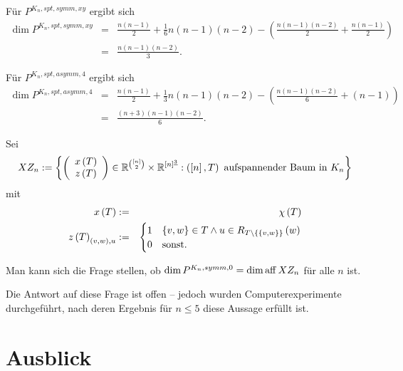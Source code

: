 \documentclass[10p,a4paper,BCOR = 12mm, DIV=15]{scrbook}
\begin{document}
{\begin{bew}
Für $P^{K_n, spt, symm, xy}$ ergibt sich
\begin{eqnarray*}
\dim P^{K_n, spt, symm, xy} & = & \frac{n \left(n-1\right)}{2}+\frac{1}{6} n \left(n-1\right)(n-2) -\left(\frac{n \left(n-1\right)\left(n-2\right)}{2}+\frac{n \left(n-1\right)}{2}\right) \\
& = & \frac{n \left(n-1\right)\left(n-2\right)}{3}.
\end{eqnarray*}

Für $P^{K_n, spt, asymm, 4}$ ergibt sich
\begin{eqnarray*}
\dim P^{K_n, spt, asymm, 4} & = & \frac{n \left(n-1\right)}{2}+\frac{1}{3} n \left(n-1\right)(n-2)  -\left(\frac{n \left(n-1\right)\left(n-2\right)}{6}+\left(n-1\right)\right) \\
& = & \frac{\left(n+3\right)\left(n-1\right)\left(n-2\right)}{6}.
\end{eqnarray*}
\end{bew}

\begin{Def}
\label{def:xz_n}
Sei
\begin{displaymath}
XZ_n := \left\{ \left(\begin{array}{c}
x\left(T\right) \\
z\left(T\right)
\end{array}\right)\in\mathbb{R}^{[n]\choose 2}\times \mathbb{R}^{[n]^{\underline{3}}}: 
\left(\left[n\right], T\right)\textnormal{ aufspannender Baum in }K_n
\right\}
\end{displaymath}
mit
\begin{eqnarray*}
x\left(T\right) & := & \chi\left(T\right) \\
z\left(T\right)_{\left(v, w\right), u} & := & \begin{cases}
1 & \left\{v, w\right\}\in T\wedge u\in R_{T\backslash \left\{\left\{v, w\right\}\right\}}\left(w\right)\\
0 & \textnormal{sonst.}
\end{cases}
\end{eqnarray*}
\end{Def}

Man kann sich die Frage stellen, ob $\dim P^{K_n, symm, 0} = \dim \operatorname{aff} XZ_n$ für alle $n$ ist.

Die Antwort auf diese Frage ist offen -- jedoch wurden Computerexperimente durchgeführt, nach deren Ergebnis für $n \leq 5$ diese Aussage erfüllt ist.

\part{Ausblick}

}
\end{document}
